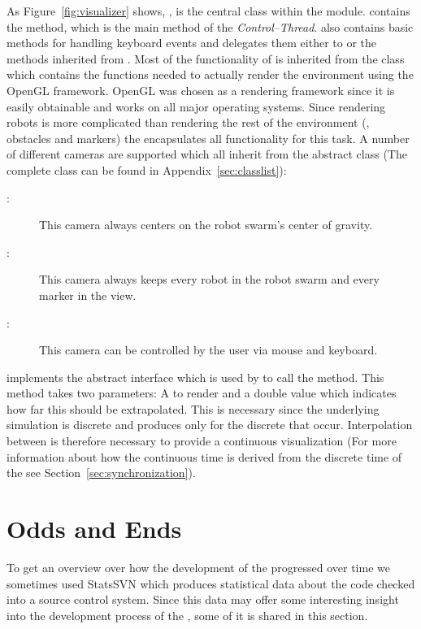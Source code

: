 As Figure~\ref{fig:visualizer} shows, , is the central class within the  module.  contains the  method, which is the main method of the \emph{Control--Thread}.  also contains basic methods for handling keyboard events and delegates them either to  or the methods inherited from .
Most of the functionality of  is inherited from the  class which contains the functions needed to actually render the environment using the OpenGL framework. OpenGL was chosen as a rendering framework since it is easily obtainable and works on all major operating systems. Since rendering robots is more complicated than rendering the rest of the environment (, obstacles and markers) the  encapsulates all functionality for this task. A number of different cameras are supported which all inherit from the abstract  class (The complete  class can be found in Appendix~\ref{sec:classlist}):

\begin{description}
\item[:] This camera always centers on the robot swarm's center of gravity.
\item[:] This camera always keeps every robot in the robot swarm and every marker in the view.
\item[:] This camera can be controlled by the user via mouse and keyboard.
\end{description}

 implements the abstract  interface which is used by  to call the  method. This method takes two parameters: A  to render and a double value which indicates how far this  should be extrapolated. This is necessary since the underlying simulation is discrete and produces  only for the discrete  that occur. Interpolation between  is therefore necessary to provide a continuous visualization (For more information about how the continuous time is derived from the discrete time of the  see Section~\ref{sec:synchronization}).

\section{Odds and Ends}\label{IG:sec:odds}
To get an overview over how the development of the \RSS progressed over time we sometimes used StatsSVN \cite{reference:StatsSVN} which produces statistical data about the code checked into a source control system.
Since this data may offer some interesting insight into the development process of the \RSS, some of it is shared in this section.


